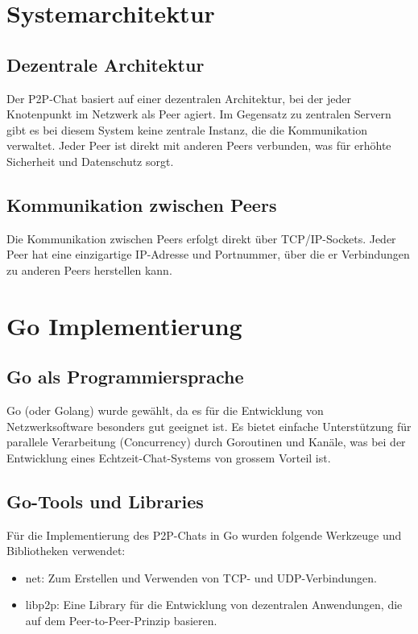 \section{Systemarchitektur}

\subsection{Dezentrale Architektur}
Der P2P-Chat basiert auf einer dezentralen Architektur, bei der jeder Knotenpunkt im Netzwerk als Peer agiert. Im Gegensatz zu zentralen Servern gibt es bei diesem System keine zentrale Instanz, die die Kommunikation verwaltet. Jeder Peer ist direkt mit anderen Peers verbunden, was für erhöhte Sicherheit und Datenschutz sorgt. \cite{peer_to_peer}

\subsection{Kommunikation zwischen Peers}
Die Kommunikation zwischen Peers erfolgt direkt über TCP/IP-Sockets. Jeder Peer hat eine einzigartige IP-Adresse und Portnummer, über die er Verbindungen zu anderen Peers herstellen kann.

\section{Go Implementierung}

\subsection{Go als Programmiersprache}

Go (oder Golang) wurde gewählt, da es für die Entwicklung von Netzwerksoftware besonders gut geeignet ist. Es bietet einfache Unterstützung für parallele Verarbeitung (Concurrency) durch Goroutinen und Kanäle, was bei der Entwicklung eines Echtzeit-Chat-Systems von grossem Vorteil ist. \cite{go_docs}

\subsection {Go-Tools und Libraries}

Für die Implementierung des P2P-Chats in Go wurden folgende Werkzeuge und Bibliotheken verwendet:

\begin{itemize}
    \item net: Zum Erstellen und Verwenden von TCP- und UDP-Verbindungen.
    \item libp2p: Eine Library für die Entwicklung von dezentralen Anwendungen, die auf dem Peer-to-Peer-Prinzip basieren. \cite{libp2p_go_getting_started}
\end{itemize}

